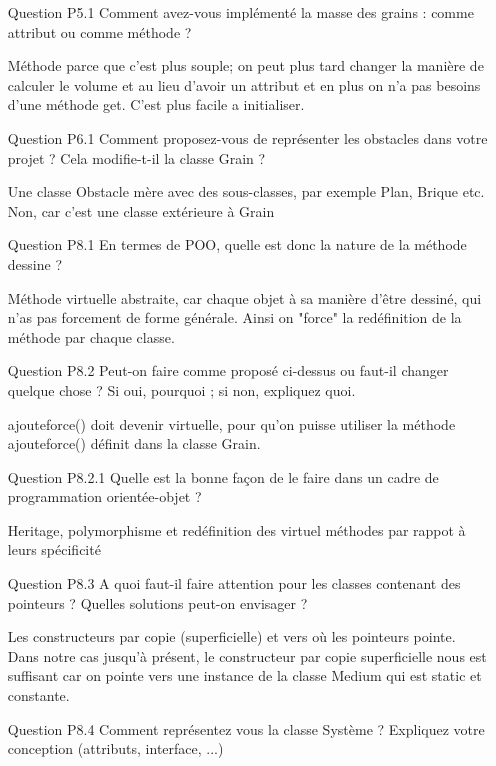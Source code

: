 \documentclass[a4paper,10pt]{article}
\begin{document}
\begin{itemize}
\item [Question P5.1] Comment avez-vous implémenté la masse des grains : comme attribut ou comme méthode ?

Méthode parce que c'est plus souple; on peut plus tard changer la manière de calculer le volume et au lieu d'avoir un attribut et en plus on n'a pas besoins d'une méthode get.
C'est plus facile a initialiser.


\item [Question P6.1] Comment proposez-vous de représenter les obstacles dans votre projet ? Cela modifie-t-il la classe Grain ?

Une classe Obstacle mère avec des sous-classes, par exemple Plan, Brique etc. Non, car c'est une classe extérieure à Grain


\item [Question P8.1] En termes de POO, quelle est donc la nature de la méthode dessine ?

Méthode virtuelle abstraite, car chaque objet à sa manière d'être dessiné, qui n'as pas forcement de forme générale. Ainsi on "force" la redéfinition de la méthode par chaque classe.


\item [Question P8.2] Peut-on faire comme proposé ci-dessus ou faut-il changer quelque chose ? Si oui, pourquoi ; si non, expliquez quoi.

ajouteforce() doit devenir virtuelle, pour qu’on puisse utiliser la méthode ajouteforce() définit dans la classe Grain.


\item [Question P8.2.1] Quelle est la bonne façon de le faire dans un cadre de programmation orientée-objet ?

Heritage, polymorphisme et redéfinition des virtuel méthodes par rappot à leurs spécificité


\item [Question P8.3] A quoi faut-il faire attention pour les classes contenant des pointeurs ? Quelles solutions peut-on envisager ?

Les constructeurs par copie (superficielle) et vers où les pointeurs pointe. Dans notre cas jusqu'à présent, le constructeur par copie superficielle nous est suffisant car on pointe vers une instance de la classe Medium qui est static et constante.


\item [Question P8.4] Comment représentez vous la classe Système ?
Expliquez votre conception (attributs, interface, ...)


\end{itemize}
\end{document}
